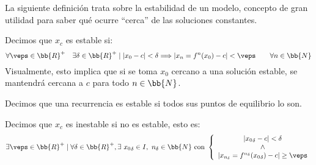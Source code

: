 La siguiente definición trata sobre la estabilidad de un modelo, concepto de gran utilidad para saber qué ocurre ``cerca'' de las soluciones constantes.
\begin{definicion}
     Decimos que $x_c$ es estable si:
    \begin{equation*}
        \forall \veps \in \bb{R}^+ \quad \exists \delta \in \bb{R}^+ \mid |x_0-c| < \delta \Longrightarrow |x_n=f^n(x_0)-c|<\veps \qquad \forall n\in \bb{N}
    \end{equation*}
    Visualmente, esto implica que si se toma $x_0$ cercano a una solución estable, se mantendrá cercana a $c$ para todo $n\in \bb{N}$.
    
    Decimos que una recurrencia es estable si todos sus puntos de equilibrio lo son.
\end{definicion}
\begin{definicion}
    Decimos que $x_c$ es inestable si no es estable, esto es:
    \begin{equation*}
        \exists \veps \in \bb{R}^+ \mid \forall \delta \in \bb{R}^+, \exists~ {x_0}_\delta\in I,~n_\delta\in \bb{N} \text{ con }
        \left\{\begin{array}{c}
             |{x_0}_\delta-c|< \delta \\\land \\|x_{n_\delta}=f^{n_\delta}({x_0}_\delta)-c| \geq \veps
        \end{array}\right.
    \end{equation*}
\end{definicion}


